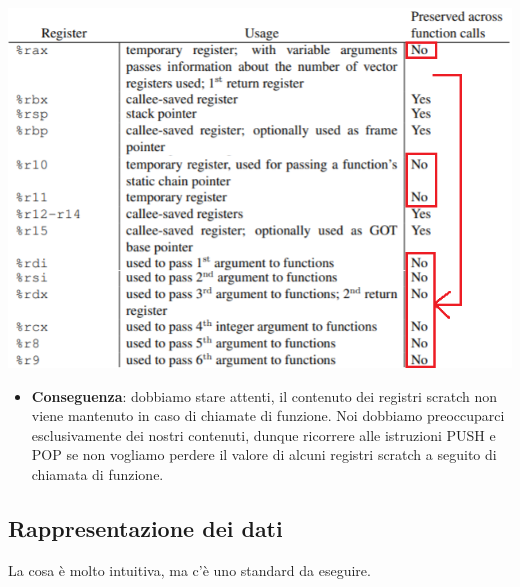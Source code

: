 			\begin{center}
				\includegraphics{img/269.PNG}
			\end{center} 
			\begin{itemize}
				\item \textbf{Conseguenza}: dobbiamo stare attenti, il contenuto dei registri scratch non viene mantenuto in caso di chiamate di funzione. Noi dobbiamo preoccuparci esclusivamente dei nostri contenuti, dunque ricorrere alle istruzioni PUSH e POP se non vogliamo perdere il valore di alcuni registri scratch a seguito di chiamata di funzione.
			\end{itemize}
			\clearpage 
			
			\subsection{Rappresentazione dei dati}
			La cosa è molto intuitiva, ma c'è uno standard da eseguire. 
